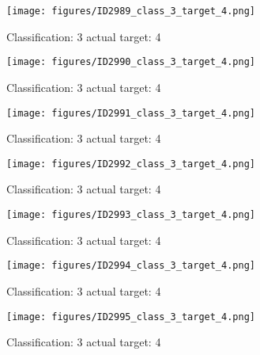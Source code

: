 \begin{figure}[h!]
\begin{center}
\texttt{[image: figures/ID2989\_class\_3\_target\_4.png]}
\end{center}
\caption{ Classification: 3 actual target: 4}
\label{fig:ID2989_class_3_target_4}
\end{figure}
\begin{figure}[h!]
\begin{center}
\texttt{[image: figures/ID2990\_class\_3\_target\_4.png]}
\end{center}
\caption{ Classification: 3 actual target: 4}
\label{fig:ID2990_class_3_target_4}
\end{figure}
\begin{figure}[h!]
\begin{center}
\texttt{[image: figures/ID2991\_class\_3\_target\_4.png]}
\end{center}
\caption{ Classification: 3 actual target: 4}
\label{fig:ID2991_class_3_target_4}
\end{figure}
\begin{figure}[h!]
\begin{center}
\texttt{[image: figures/ID2992\_class\_3\_target\_4.png]}
\end{center}
\caption{ Classification: 3 actual target: 4}
\label{fig:ID2992_class_3_target_4}
\end{figure}
\begin{figure}[h!]
\begin{center}
\texttt{[image: figures/ID2993\_class\_3\_target\_4.png]}
\end{center}
\caption{ Classification: 3 actual target: 4}
\label{fig:ID2993_class_3_target_4}
\end{figure}
\begin{figure}[h!]
\begin{center}
\texttt{[image: figures/ID2994\_class\_3\_target\_4.png]}
\end{center}
\caption{ Classification: 3 actual target: 4}
\label{fig:ID2994_class_3_target_4}
\end{figure}
\begin{figure}[h!]
\begin{center}
\texttt{[image: figures/ID2995\_class\_3\_target\_4.png]}
\end{center}
\caption{ Classification: 3 actual target: 4}
\label{fig:ID2995_class_3_target_4}
\end{figure}
